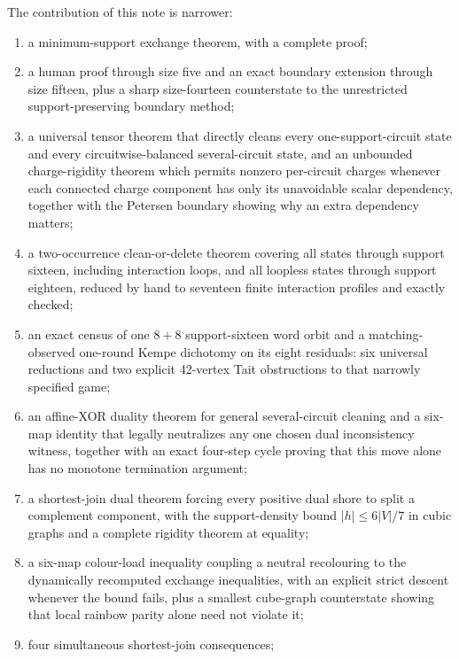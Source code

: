 \documentclass[11pt]{article}
\theoremstyle{definition}
\theoremstyle{remark}
\begin{document}
The contribution of this note is narrower:
\begin{enumerate}
  \item a minimum-support exchange theorem, with a complete proof;
  \item a human proof through size five and an exact boundary extension
        through size fifteen, plus a sharp size-fourteen counterstate
        to the unrestricted support-preserving boundary method;
  \item a universal tensor theorem that directly cleans every
        one-support-circuit state and every circuitwise-balanced
        several-circuit state, and an unbounded charge-rigidity theorem
        which permits nonzero per-circuit charges whenever each connected
        charge component has only its unavoidable scalar dependency,
        together with the Petersen boundary showing why an extra
        dependency matters;
  \item a two-occurrence clean-or-delete theorem covering all states
        through support sixteen, including interaction loops, and all
        loopless states through support eighteen, reduced by hand to
        seventeen finite interaction profiles and exactly checked;
  \item an exact census of one \(8+8\) support-sixteen word orbit and a
        matching-observed one-round Kempe dichotomy on its eight
        residuals: six universal reductions and two explicit
        42-vertex Tait obstructions to that narrowly specified game;
  \item an affine-XOR duality theorem for general several-circuit
        cleaning and a six-map identity that legally neutralizes any one
        chosen dual inconsistency witness, together with an exact
        four-step cycle proving that this move alone has no monotone
        termination argument;
  \item a shortest-join dual theorem forcing every positive dual shore
        to split a complement component, with the support-density bound
        \(|h|\le6|V|/7\) in cubic graphs and a complete rigidity theorem
        at equality;
  \item a six-map colour-load inequality coupling a neutral recolouring
        to the dynamically recomputed exchange inequalities, with an
        explicit strict descent whenever the bound fails, plus a smallest
        cube-graph counterstate showing that local rainbow parity alone
        need not violate it;
  \item four simultaneous shortest-join consequences;

\end{enumerate}
\end{document}
